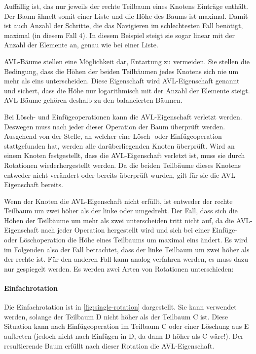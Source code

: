 \documentclass[a4paper, parskip]{scrartcl}
\begin{document}
Auffällig ist, das nur jeweils der rechte Teilbaum eines Knotens Einträge enthält.
Der Baum ähnelt somit einer Liste und die Höhe des Baums ist maximal.
Damit ist auch Anzahl der Schritte, die das Navigieren im schlechtesten Fall benötigt, maximal (in diesem Fall $4$).
In diesem Beispiel steigt sie sogar linear mit der Anzahl der Elemente an, genau wie bei einer Liste.

AVL-Bäume\cite{avl62} stellen eine Möglichkeit dar, Entartung zu vermeiden.
Sie stellen die Bedingung, dass die Höhen der beiden Teilbäumen jedes Knotens sich nie um mehr als eins unterscheiden.
Diese Eigenschaft wird AVL-Eigenschaft genannt und sichert, dass die Höhe nur logarithmisch mit der Anzahl der Elemente steigt.
AVL-Bäume gehören deshalb zu den balancierten Bäumen.

Bei Lösch- und Einfügeoperationen kann die AVL-Eigenschaft verletzt werden.
Deswegen muss nach jeder dieser Operation der Baum überprüft werden.
Ausgehend von der Stelle, an welcher eine Lösch- oder Einfügeoperation stattgefunden hat, werden alle darüberliegenden Knoten überprüft.
Wird an einem Knoten festgestellt, dass die AVL-Eigenschaft verletzt ist, muss sie durch Rotationen wiederhergestellt werden.
Da die beiden Teilbäume dieses Knotens entweder nicht verändert oder bereits überprüft wurden, gilt für sie die AVL-Eigenschaft bereits.

Wenn der Knoten die AVL-Eigenschaft nicht erfüllt, ist entweder der rechte Teilbaum um zwei höher als der linke oder umgedreht. 
Der Fall, dass sich die Höhen der Teilbäume um mehr als zwei unterscheiden tritt nicht auf, da die AVL-Eigenschaft nach jeder Operation hergestellt wird und sich bei einer Einfüge- oder Löschoperation die Höhe eines Teilbaums um maximal eins ändert.
Es wird im Folgenden also der Fall betrachtet, dass der linke Teilbaum um zwei höher als der rechte ist.
Für den anderen Fall kann analog verfahren werden, es muss dazu nur gespiegelt werden.
Es werden zwei Arten von Rotationen unterschieden:

\paragraph{Einfachrotation}
Die Einfachrotation ist in \autoref{fig:single-rotation} dargestellt. 
Sie kann verwendet werden, solange der Teilbaum D nicht höher als der Teilbaum C ist.
Diese Situation kann nach Einfügeoperation im Teilbaum C oder einer Löschung aus E auftreten (jedoch nicht nach Einfügen in D, da dann D höher als C wäre!).
Der resultierende Baum erfüllt nach dieser Rotation die AVL-Eigenschaft.
\end{document}
